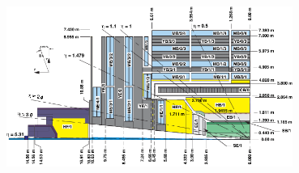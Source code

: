 \begin{center}\label{CMS-SUBD}
\centering
\mbox{\includegraphics[height= 0.5\textwidth, width=0.7\textwidth]{THESISPLOTS/CMS_Int_View.png}} 
\label{fig:cmslview.}
\end{center}
\clearpage
